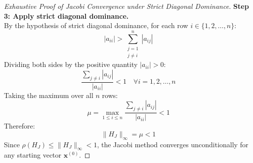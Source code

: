\begin{proof}[Exhaustive Proof of Jacobi Convergence under Strict Diagonal Dominance]
\noindent\textbf{Step 3: Apply strict diagonal dominance.} \\
By the hypothesis of strict diagonal dominance, for each row $i \in \{1, 2, \dots, n\}$:
\begin{equation}
    |a_{ii}| > \sum_{\substack{j=1 \\ j \ne i}}^n |a_{ij}|
\end{equation}
Dividing both sides by the positive quantity $|a_{ii}| > 0$:
\begin{equation}
    \frac{\sum_{j \ne i} |a_{ij}|}{|a_{ii}|} < 1 \quad \forall i = 1, 2, \dots, n
\end{equation}
Taking the maximum over all $n$ rows:
\begin{equation}
    \mu = \max_{1 \le i \le n} \frac{\sum_{j \ne i} |a_{ij}|}{|a_{ii}|} < 1
\end{equation}
Therefore:
\begin{equation}
    \boxed{\|H_J\|_\infty = \mu < 1}
\end{equation}
Since $\rho(H_J) \le \|H_J\|_\infty < 1$, the Jacobi method converges unconditionally for any starting vector $\mathbf{x}^{(0)}$.
\end{proof}

